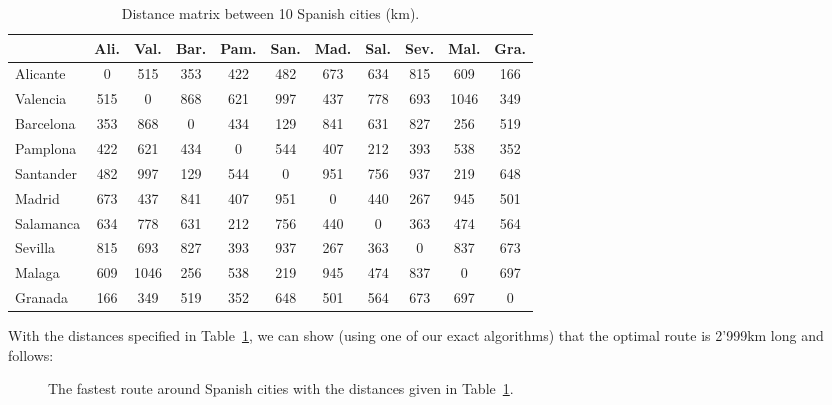 \begin{table}[hbt]
\begin{center}
\begin{tabular}{|l|cccccccccc|}
\cline{2-11}
\multicolumn{1}{c|}{} & Ali.   & Val.  & Bar. & Pam. & San. & Mad. & Sal. & Sev. & Mal.  & Gra. \\
\hline 
Alicante	& 0   & 515  & 353 & 422 & 482 & 673 & 634 & 815 & 609  & 166 \\
Valencia    & 515 & 0    & 868 & 621 & 997 & 437 & 778 & 693 & 1046 & 349 \\
Barcelona	& 353 & 868  & 0   & 434 & 129 & 841 & 631 & 827 & 256  & 519 \\
Pamplona	& 422 & 621  & 434 & 0   & 544 & 407 & 212 & 393 & 538  & 352 \\
Santander	& 482 & 997  & 129 & 544 & 0   & 951 & 756 & 937 & 219  & 648 \\
Madrid		& 673 & 437  & 841 & 407 & 951 & 0   & 440 & 267 & 945  & 501 \\
Salamanca	& 634 & 778  & 631 & 212 & 756 & 440 & 0   & 363 & 474  & 564 \\
Sevilla		& 815 & 693  & 827 & 393 & 937 & 267 & 363 & 0   & 837  & 673 \\
Malaga		& 609 & 1046 & 256 & 538 & 219 & 945 & 474 & 837 & 0    & 697 \\
Granada		& 166 & 349  & 519 & 352 & 648 & 501 & 564 & 673 & 697  & 0   \\
\hline 
\end{tabular}
\caption{Distance matrix between 10 Spanish cities (km).}
\label{tab:distance_matrix}
\end{center}
\end{table}	

With the distances specified in Table~\ref{tab:distance_matrix}, we can show (using one of our exact algorithms) that the optimal route is 2'999\:km long and follows:\\

\begin{figure}[htb]
\begin{center}
\caption{The fastest route around Spanish cities with the distances given in Table~\ref{tab:distance_matrix}.}
\label{fig:fastest_route_around_spannish_cities}
\end{center}
\end{figure}
\clearpage